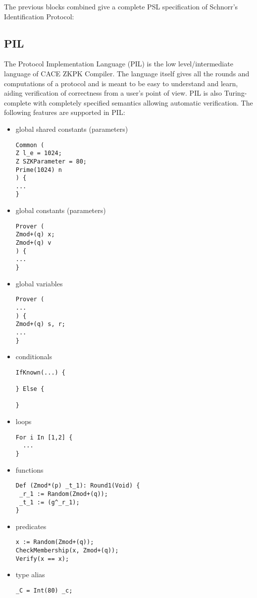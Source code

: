 The previous blocks combined give a complete PSL specification of
Schnorr's Identification Protocol:


\subsection{PIL}
\label{subsec:pil}

The Protocol Implementation Language (PIL) is the low
level/intermediate language of CACE ZKPK Compiler. The language itself
gives all the rounds and computations of a protocol and is meant to be
easy to understand and learn, aiding verification of correctness from
a user's point of view. PIL is also Turing-complete with completely
specified semantics allowing automatic verification. The following
features are supported in PIL:
\begin{itemize}
\item global shared constants (parameters)
\begin{lstlisting}[language=PIL]
Common (
Z l_e = 1024;
Z SZKParameter = 80;
Prime(1024) n
) {
...
}
\end{lstlisting}

\item global constants (parameters)
\begin{lstlisting}[language=PIL]
Prover (
Zmod+(q) x;
Zmod+(q) v
) {
...
}
\end{lstlisting}

\item global variables
\begin{lstlisting}[language=PIL]
Prover (
...
) {
Zmod+(q) s, r;
...
}
\end{lstlisting}

\item conditionals
\begin{lstlisting}[language=PIL]
IfKnown(...) {

} Else {

}
\end{lstlisting}

\item loops
\begin{lstlisting}[language=PIL]
For i In [1,2] {
  ...
}
\end{lstlisting}

\item functions
\begin{lstlisting}[language=PIL]
Def (Zmod*(p) _t_1): Round1(Void) {
 _r_1 := Random(Zmod+(q));
 _t_1 := (g^_r_1);
}
\end{lstlisting}

\item predicates
\begin{lstlisting}
x := Random(Zmod+(q));
CheckMembership(x, Zmod+(q));
Verify(x == x);
\end{lstlisting}

\item type alias
\begin{lstlisting}
_C = Int(80) _c;
\end{lstlisting}

\end{itemize}

